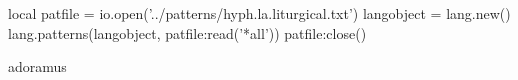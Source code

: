 \documentclass{article}
\begin{document}
\begin{luacode}
local patfile = io.open('../patterns/hyph.la.liturgical.txt')
langobject = lang.new()
lang.patterns(langobject, patfile:read('*all'))
patfile:close()
\end{luacode}

\language{}

adoramus
\end{document}
